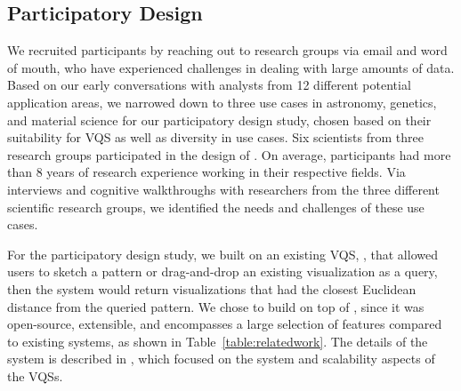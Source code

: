 \subsection{Participatory Design}
\par We recruited participants by reaching out to research groups via email and word of mouth, who have experienced challenges in dealing with large amounts of data. Based on our early conversations with analysts from 12 different potential application areas, we narrowed down to three use cases in astronomy, genetics, and material science for our participatory design study, chosen based on their suitability for VQS as well as diversity in use cases. Six scientists from three research groups participated in the design of \zv. On average, participants had more than 8 years of research experience working in their respective fields. Via interviews and cognitive walkthroughs with researchers from the three different scientific research groups, we identified the needs and challenges of these use cases. 
\par For the participatory design study, we built on an existing VQS, \zv, that allowed users to sketch a pattern or drag-and-drop an existing visualization as a query, then the system would return visualizations that had the closest Euclidean distance from the queried pattern. We chose to build on top of \zv, since it was open-source, extensible, and encompasses a large selection of features compared to existing systems, as shown in Table~\ref{table:relatedwork}. The details of the system is described in \cite{Siddiqui2017,Siddiqui2017VLDB}, which focused on the system and scalability aspects of the VQSs. %




